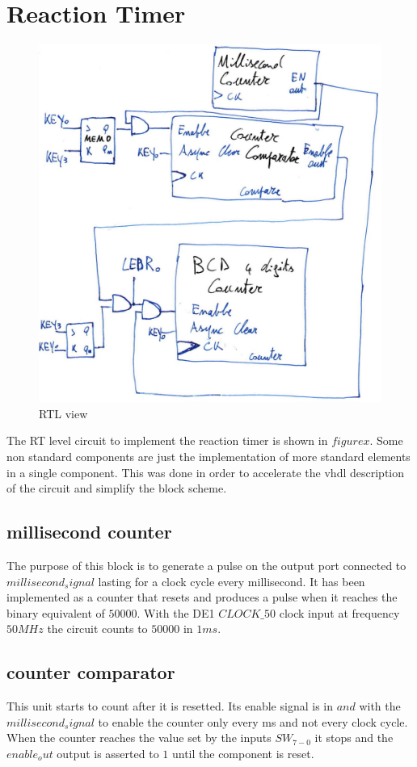 \documentclass[12pt]{article}
\begin{document}
\section{Reaction Timer}
\begin{figure}[h]
\centering
\includegraphics[scale = 0.6]{immagini/RT5.jpg}
\caption{RTL view}
\end{figure}
The RT level circuit to implement the reaction timer is shown in $figure x$. Some non standard components are just the implementation of more standard elements in a single component. This was done in order to accelerate the vhdl description of the circuit and simplify the block scheme.
\subsection{millisecond counter}
The purpose of this block is to generate a pulse on the output port connected to $millisecond_signal$ lasting for a clock cycle every millisecond. It has been implemented as a counter that resets and produces a pulse when it reaches the binary equivalent of $50000$. With the DE1 $CLOCK\_50$ clock input at frequency $50MHz$ the circuit counts to $50000$ in $1ms$.
\subsection{counter comparator}
This unit starts to count after it is resetted. Its enable signal is in $and$ with the $millisecond_signal$ to enable the counter only every ms and not every clock cycle. \\When the counter reaches the value set by the inputs $SW_{7-0}$ it stops and the $enable_out$ output is asserted to $1$ until the component is reset.
\end{document}
